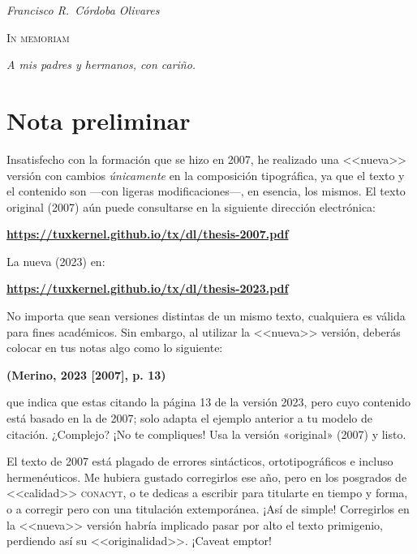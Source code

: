 \documentclass[14pt,twoside,final]{extbook} %
\begin{document}
\newpage
\pagestyle{empty}
\vspace*{42pt}
\begin{flushright}
\textit{Francisco R.~Córdoba Olivares}
\end{flushright}
\begin{flushright}
\textsc{In memoriam}
\vspace*{28pt}
\end{flushright}
\begin{flushright}
\textit{A mis padres y hermanos, con cariño.}
\end{flushright}
\newpage
\pagestyle{empty}
\newpage
\pagestyle{empty}
\chapter*{Nota preliminar}\label{ch:nota-preliminar}
Insatisfecho con la formación que se hizo en 2007, he realizado una <<nueva>> versión con cambios \emph{únicamente} en la composición tipográfica, ya que el texto y el contenido son ---con ligeras modificaciones---, en esencia, los mismos. El texto original (2007) aún puede consultarse en la siguiente dirección electrónica:
\begin{center}
\href{https://tuxkernel.github.io/tx/dl/thesis-2007.pdf}{\bfseries https://tuxkernel.github.io/tx/dl/thesis-2007.pdf}
\end{center}
La nueva (2023) en:
\begin{center}
\href{https://tuxkernel.github.io/tx/dl/thesis-2023.pdf}{\bfseries https://tuxkernel.github.io/tx/dl/thesis-2023.pdf}
\end{center}
No importa que sean versiones distintas de un mismo texto, cualquiera es válida para fines académicos. Sin embargo, al utilizar la <<nueva>> versión, deberás colocar en tus notas algo como lo siguiente:
\begin{center}
\bfseries (Merino, 2023 [2007], p. 13)
\end{center}
\noindent que indica que estas citando la página 13 de la versión 2023, pero cuyo contenido está basado en la de 2007; solo adapta el ejemplo anterior a tu modelo de citación. ¿Complejo? ¡No te compliques! Usa la versión «original» (2007) y listo.

El texto de 2007 está plagado de errores sintácticos, ortotipográficos e incluso hermenéuticos. Me hubiera gustado corregirlos ese año, pero en los posgrados de <<calidad>> \textsc{conacyt}, o te dedicas a escribir para titularte en tiempo y forma, o a corregir pero con una titulación extemporánea. ¡Así de simple! Corregirlos en la <<nueva>> versión habría implicado pasar por alto el texto primigenio, perdiendo así su <<originalidad>>. ¡Caveat emptor!
\end{document}
